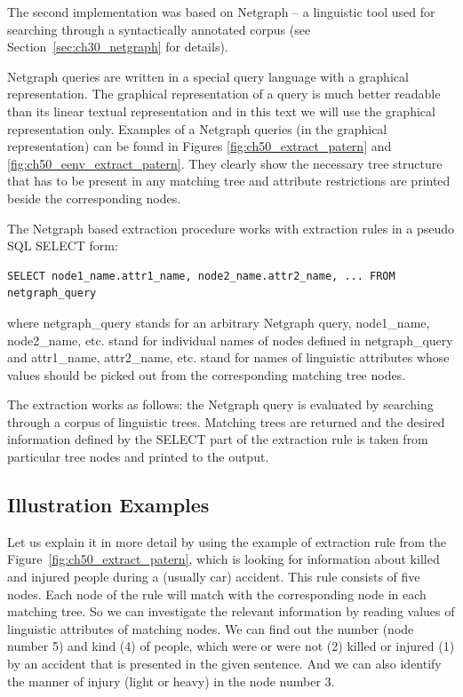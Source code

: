 The second implementation was based on Netgraph -- a linguistic tool used for searching through a syntactically annotated corpus (see Section~\ref{sec:ch30_netgraph} for details). 

Netgraph queries are written in a special query language with a graphical representation. The graphical representation of a query is much better readable than its linear textual representation and in this text we will use the graphical representation only. Examples of a Netgraph queries (in the graphical representation) can be found in Figures \ref{fig:ch50_extract_patern} and \ref{fig:ch50_eenv_extract_patern}. They clearly show the necessary tree structure that has to be present in any matching tree and attribute restrictions are printed beside the corresponding nodes.

The Netgraph based extraction procedure works with extraction rules in a pseudo SQL SELECT form:

\begin{verbatim}
SELECT node1_name.attr1_name, node2_name.attr2_name, ... FROM netgraph_query
\end{verbatim}

where netgraph\_query stands for an arbitrary Netgraph query, node1\_name, node2\_name, etc. stand for individual names of nodes defined in netgraph\_query and attr1\_name, attr2\_name, etc. stand for names of linguistic attributes whose values should be picked out from the corresponding matching tree nodes.

The extraction works as follows: the Netgraph query is evaluated by searching through a corpus of linguistic trees. Matching trees are returned and the desired information defined by the SELECT part of the extraction rule is taken from particular tree nodes and printed to the output.

\subsection{Illustration Examples}

Let us explain it in more detail by using the example of extraction rule from the Figure~\ref{fig:ch50_extract_patern}, which is looking for information about killed and injured people during a (usually car) accident. This rule consists of five nodes. Each node of the rule will match with the corresponding node in each matching tree. So we can investigate the relevant information by reading values of linguistic attributes of matching nodes. We can find out the number (node number 5) and kind (4) of people, which were or were not (2) killed or injured (1) by an accident that is presented in the given sentence. And we can also identify the manner of injury (light or heavy) in the node number 3.

